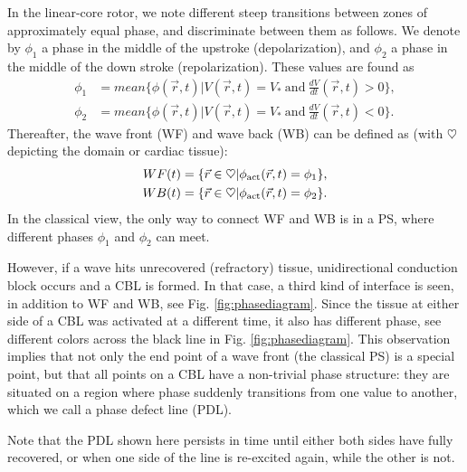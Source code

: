 \documentclass{article}
\newcommand{\phiact}{\ensuremath{\phi_{\rm act}}}
\newcommand{\VS}{V_*}
\begin{document}
In the linear-core rotor, we note different steep transitions between zones of approximately equal phase, and discriminate between them as follows. 
We denote by $\phi_1$ a phase in the middle of the upstroke (depolarization), and $\phi_2$ a phase in the middle of the down stroke (repolarization). 
These values are found as
\begin{align}
    \phi_1 &= mean \{ \phi(\vec{r},t) | V(\vec{r},t) = \VS \ \mathrm{and}\ \frac{dV}{dt}(\vec{r},t) >0\}, \nonumber \\
    \phi_2 &= mean \{ \phi(\vec{r},t) | V(\vec{r},t) = \VS \ \mathrm{and}\ \frac{dV}{dt}(\vec{r},t) < 0\}. \label{defphi12}
\end{align}
Thereafter, the wave front (WF) and wave back (WB) can be defined as (with $\heartsuit$ depicting the domain or cardiac tissue): 
\begin{align}
     WF (t)  = \{\vec{r} \in \heartsuit | \phiact(\vec{r},t) = \phi_1 \}, \label{WF} \\
     WB (t)  = \{\vec{r} \in \heartsuit | \phiact(\vec{r},t) = \phi_2 \}. \nonumber
\end{align}
In the classical view, the only way to connect WF and WB is in a PS, where different phases $\phi_1$ and $\phi_2$ can meet. 

 However, if a wave hits unrecovered (refractory) tissue, unidirectional conduction block occurs and a CBL is formed. In that case, a third kind of interface is seen, in addition to WF and WB, see Fig. \ref{fig:phasediagram}. Since the tissue at either side of a CBL was activated at a different time, it also has different phase, see different colors across the black line in Fig. \ref{fig:phasediagram}. This observation implies that not only the end point of a wave front (the classical PS) is a special point, but that all points on a CBL have a non-trivial phase structure: they are situated on a region where phase suddenly transitions from one value to another, which we call a phase defect line (PDL). 
 
 Note that the PDL shown here persists in time until either both sides have fully recovered, or when one side of the line is re-excited again, while the other is not. 
\end{document}
